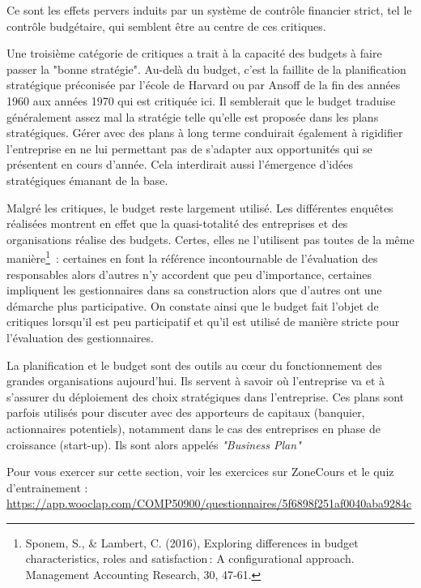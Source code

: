 \documentclass[oneside]{kaobook}
\begin{document}
Ce sont les effets pervers induits par un système de contrôle financier strict, tel le contrôle budgétaire, qui semblent être au centre de ces critiques. 

Une troisième catégorie de critiques a trait à la capacité des budgets à faire passer la "bonne stratégie". Au-delà du budget, c'est la faillite de la planification stratégique préconisée par l'école de Harvard ou par Ansoff de la fin des années 1960 aux années 1970 qui est critiquée ici. Il semblerait que le budget traduise généralement assez mal la stratégie telle qu'elle est proposée dans les plans stratégiques. Gérer avec des plans à long terme conduirait également à rigidifier l'entreprise en ne lui permettant pas de s'adapter aux opportunités qui se présentent en cours d'année. Cela interdirait aussi l'émergence d'idées stratégiques émanant de la base. 

Malgré les critiques, le budget reste largement utilisé. Les différentes enquêtes réalisées montrent en effet que la quasi-totalité des entreprises et des organisations réalise des budgets. Certes, elles ne l'utilisent pas toutes de la même manière\footnote{Sponem, S., \& Lambert, C. (2016), Exploring differences in budget characteristics, roles and satisfaction : A configurational approach. Management Accounting Research, 30, 47‑61.} : certaines en font la référence incontournable de l'évaluation des responsables alors d'autres n'y accordent que peu d'importance, certaines impliquent les gestionnaires dans sa construction alors que d'autres ont une démarche plus participative. On constate ainsi que le budget fait l'objet de critiques lorsqu'il est peu participatif et qu'il est utilisé de manière stricte pour l'évaluation des gestionnaires.

La planification et le budget sont des outils au cœur du fonctionnement des grandes organisations aujourd'hui. Ils servent à savoir où l'entreprise va et à s'assurer du déploiement des choix stratégiques dans l'entreprise. Ces plans sont parfois utilisés pour discuter avec des apporteurs de capitaux (banquier, actionnaires potentiels), notamment dans le cas des entreprises en phase de croissance (start-up). Ils sont alors appelés \emph{"Business Plan"}

\begin{kaobox}
Pour vous exercer sur cette section, voir les exercices sur ZoneCours et le quiz d'entrainement : \url{https://app.wooclap.com/COMP50900/questionnaires/5f6898f251af0040aba9284c}
\end{kaobox}
\end{document}
